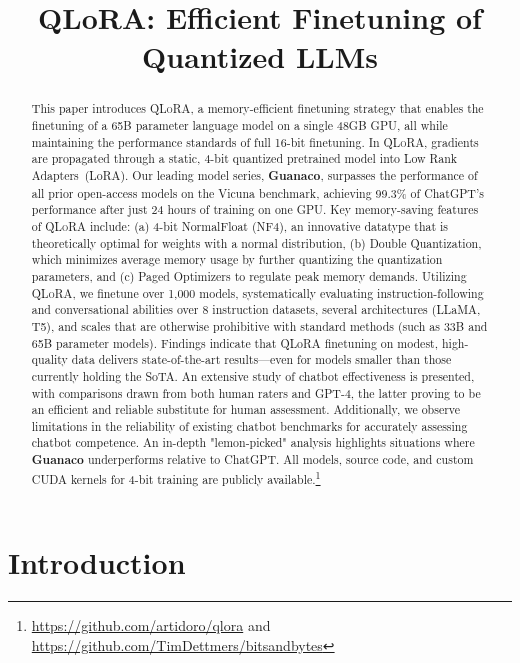 \title{QLoRA: Efficient Finetuning of Quantized LLMs}

\begin{abstract}
This paper introduces \textsc{QLoRA}, a memory-efficient finetuning strategy that enables the finetuning of a 65B parameter language model on a single 48GB GPU, all while maintaining the performance standards of full 16-bit finetuning. In \textsc{QLoRA}, gradients are propagated through a static, 4-bit quantized pretrained model into Low Rank Adapters~(LoRA). Our leading model series, \textbf{Guanaco}, surpasses the performance of all prior open-access models on the Vicuna benchmark, achieving 99.3\% of ChatGPT's performance after just 24 hours of training on one GPU. Key memory-saving features of \textsc{QLoRA} include: (a) 4-bit NormalFloat (NF4), an innovative datatype that is theoretically optimal for weights with a normal distribution, (b) Double Quantization, which minimizes average memory usage by further quantizing the quantization parameters, and (c) Paged Optimizers to regulate peak memory demands. Utilizing \textsc{QLoRA}, we finetune over 1,000 models, systematically evaluating instruction-following and conversational abilities over 8 instruction datasets, several architectures (LLaMA, T5), and scales that are otherwise prohibitive with standard methods (such as 33B and 65B parameter models). Findings indicate that QLoRA finetuning on modest, high-quality data delivers state-of-the-art results—even for models smaller than those currently holding the SoTA. An extensive study of chatbot effectiveness is presented, with comparisons drawn from both human raters and GPT-4, the latter proving to be an efficient and reliable substitute for human assessment. Additionally, we observe limitations in the reliability of existing chatbot benchmarks for accurately assessing chatbot competence. An in-depth "lemon-picked" analysis highlights situations where \textbf{Guanaco} underperforms relative to ChatGPT. All models, source code, and custom CUDA kernels for 4-bit training are publicly available.\footnote{\url{https://github.com/artidoro/qlora} and \url{https://github.com/TimDettmers/bitsandbytes}}
\end{abstract}

\section{Introduction}

